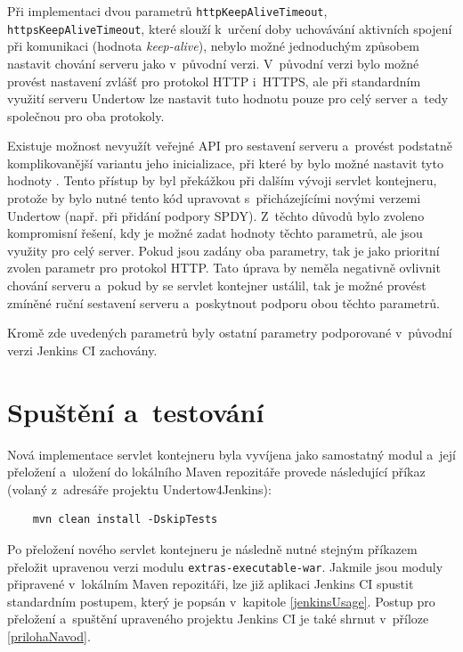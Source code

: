         
        Při implementaci dvou parametrů \texttt{httpKeepAliveTimeout}, \texttt{httpsKeepAliveTimeout}, které slouží 
        k~určení doby uchovávání aktivních spojení při komunikaci (hodnota \emph{keep-alive}), nebylo možné jednoduchým způsobem
        nastavit chování serveru jako v~původní verzi. V~původní verzi bylo možné provést nastavení zvlášť pro
        protokol HTTP i~HTTPS, ale při standardním využití serveru Undertow lze nastavit tuto hodnotu pouze pro celý
        server a~tedy společnou pro oba protokoly. 
        
        Existuje možnost nevyužít veřejné API pro sestavení serveru 
        a~provést podstatně komplikovanější variantu jeho inicializace, při které by bylo možné nastavit tyto hodnoty \cite{undertowAssembly}.
        Tento přístup by byl překážkou při dalším vývoji servlet kontejneru, protože by bylo nutné tento
        kód upravovat s~přicházejícími novými verzemi Undertow (např. při přidání podpory SPDY). 
        Z~těchto důvodů bylo zvoleno kompromisní řešení, kdy je možné zadat hodnoty těchto parametrů, ale
        jsou využity pro celý server. Pokud jsou zadány oba parametry, tak je jako prioritní zvolen
        parametr pro protokol HTTP. Tato úprava by neměla negativně ovlivnit chování serveru a~pokud
        by se servlet kontejner ustálil, tak je možné provést zmíněné ruční sestavení serveru a~poskytnout
        podporu obou těchto parametrů.
          
        Kromě zde uvedených parametrů byly ostatní parametry podporované v~původní
        verzi Jenkins CI zachovány.

        



    \section{Spuštění a~testování} \label{implSpusteni}
        Nová implementace servlet kontejneru byla vyvíjena jako samostatný modul a~její přeložení
        a~uložení do lokálního Maven repozitáře provede následující příkaz (volaný z~adresáře projektu
        Undertow4Jenkins):

\begin{verbatim}
    mvn clean install -DskipTests
\end{verbatim}
    
    Po přeložení nového servlet kontejneru je následně nutné stejným příkazem přeložit upravenou
    verzi modulu \texttt{extras-executable-war}. Jakmile jsou moduly připravené
    v~lokálním Maven repozitáři, lze již aplikaci Jenkins CI spustit standardním postupem,
    který je popsán v~kapitole \ref{jenkinsUsage}.
    Postup pro přeložení a~spuštění upraveného projektu Jenkins CI 
    je také shrnut v~příloze \ref{prilohaNavod}.

